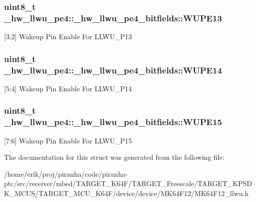 \subsubsection[{\texorpdfstring{W\+U\+P\+E13}{WUPE13}}]{\setlength{\rightskip}{0pt plus 5cm}uint8\+\_\+t \+\_\+hw\+\_\+llwu\+\_\+pe4\+::\+\_\+hw\+\_\+llwu\+\_\+pe4\+\_\+bitfields\+::\+W\+U\+P\+E13}\hypertarget{struct__hw__llwu__pe4_1_1__hw__llwu__pe4__bitfields_a1e7e3046a7b70044049bd31ef5629645}{}\label{struct__hw__llwu__pe4_1_1__hw__llwu__pe4__bitfields_a1e7e3046a7b70044049bd31ef5629645}
\mbox{[}3\+:2\mbox{]} Wakeup Pin Enable For L\+L\+W\+U\+\_\+\+P13 
\subsubsection[{\texorpdfstring{W\+U\+P\+E14}{WUPE14}}]{\setlength{\rightskip}{0pt plus 5cm}uint8\+\_\+t \+\_\+hw\+\_\+llwu\+\_\+pe4\+::\+\_\+hw\+\_\+llwu\+\_\+pe4\+\_\+bitfields\+::\+W\+U\+P\+E14}\hypertarget{struct__hw__llwu__pe4_1_1__hw__llwu__pe4__bitfields_adfd71d498c1e6849541b91b03e5c6b86}{}\label{struct__hw__llwu__pe4_1_1__hw__llwu__pe4__bitfields_adfd71d498c1e6849541b91b03e5c6b86}
\mbox{[}5\+:4\mbox{]} Wakeup Pin Enable For L\+L\+W\+U\+\_\+\+P14 
\subsubsection[{\texorpdfstring{W\+U\+P\+E15}{WUPE15}}]{\setlength{\rightskip}{0pt plus 5cm}uint8\+\_\+t \+\_\+hw\+\_\+llwu\+\_\+pe4\+::\+\_\+hw\+\_\+llwu\+\_\+pe4\+\_\+bitfields\+::\+W\+U\+P\+E15}\hypertarget{struct__hw__llwu__pe4_1_1__hw__llwu__pe4__bitfields_a908b3defdf802ad700b31f0e95dba431}{}\label{struct__hw__llwu__pe4_1_1__hw__llwu__pe4__bitfields_a908b3defdf802ad700b31f0e95dba431}
\mbox{[}7\+:6\mbox{]} Wakeup Pin Enable For L\+L\+W\+U\+\_\+\+P15 

The documentation for this struct was generated from the following file\+:\begin{DoxyCompactItemize}
\item 
/home/erik/proj/piranha/code/piranha-\/ptc/src/receiver/mbed/\+T\+A\+R\+G\+E\+T\+\_\+\+K64\+F/\+T\+A\+R\+G\+E\+T\+\_\+\+Freescale/\+T\+A\+R\+G\+E\+T\+\_\+\+K\+P\+S\+D\+K\+\_\+\+M\+C\+U\+S/\+T\+A\+R\+G\+E\+T\+\_\+\+M\+C\+U\+\_\+\+K64\+F/device/device/\+M\+K64\+F12/M\+K64\+F12\+\_\+llwu.\+h\end{DoxyCompactItemize}
